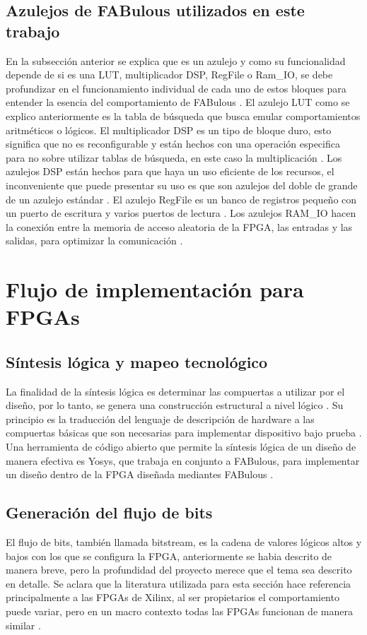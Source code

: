 \subsection{Azulejos de FABulous utilizados en este trabajo}
En la subsección anterior se explica que es un azulejo y como su funcionalidad depende de si es una LUT, multiplicador DSP, RegFile o Ram\_IO, se debe profundizar en el funcionamiento individual de cada uno de estos bloques para entender la esencia del comportamiento de FABulous \cite{fabulous2024, meschkov2025design}. El azulejo LUT como se explico anteriormente es la tabla de búsqueda que busca emular comportamientos aritméticos o lógicos. El multiplicador DSP es un tipo de bloque duro, esto significa que no es reconfigurable y están hechos con una operación especifica para no sobre utilizar tablas de búsqueda, en este caso la multiplicación \cite{fabulous2024}. Los azulejos DSP están hechos para que haya un uso eficiente de los recursos, el inconveniente que puede presentar su uso es que son azulejos del doble de grande de un azulejo estándar \cite{H_bottcher2023}. El azulejo RegFile es un banco de registros pequeño con un puerto de escritura y varios puertos de lectura \cite{fabulous2024}. Los azulejos RAM\_IO hacen la conexión entre la memoria de acceso aleatoria de la FPGA, las entradas y las salidas, para optimizar la comunicación \cite{G_koch2021}.

\section{Flujo de implementación para FPGAs}
\subsection{Síntesis lógica y mapeo tecnológico}
La finalidad de la síntesis lógica es determinar las compuertas a utilizar por el diseño, por lo tanto, se genera una construcción estructural a nivel lógico \cite{N_lopezvallejo2004, K_maldonado2011}. Su principio es la traducción del lenguaje de descripción de hardware a las compuertas básicas que son necesarias para implementar dispositivo bajo prueba \cite{I_demicheli2005}. Una herramienta de código abierto que permite la síntesis lógica de un diseño de manera efectiva es Yosys, que trabaja en conjunto a FABulous, para implementar un diseño dentro de la FPGA diseñada mediantes FABulous \cite{wolf2024yosys, fabulous2024}.

\subsection{Generación del flujo de bits}
El flujo de bits, también llamada bitstream, es la cadena de valores lógicos altos y bajos con los que se configura la FPGA, anteriormente se habia descrito de manera breve, pero la profundidad del proyecto merece que el tema sea descrito en detalle. Se aclara que la literatura utilizada para esta sección hace referencia principalmente a las FPGAs de Xilinx, al ser propietarios el comportamiento puede variar, pero en un macro contexto todas las FPGAs funcionan de manera similar \cite{shan2019fpga, M_terasic2017, L_altera2025}.

